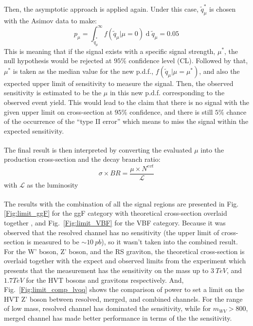 \\
\\Then, the asymptotic approach is applied again. Under this case, $\tilde{q}_{\mu}^{*}$ is chosen with the Asimov data to make:
\begin{equation}
p_{\mu}=\int_{\tilde{q}_{\mu}^{*}}^{\infty}f(\tilde{q}_{\mu}|\mu=0)\operatorname{d}\tilde{q}_{\mu}=0.05
\end{equation}
\noindent
This is meaning that if the signal exists with a specific signal strength, $\mu^*$, the null hypothesis would be rejected at $95\%$ confidence level (CL). Followed by that, $\mu^*$ is taken as the median value for the new p.d.f., $f(\tilde{q}_{\mu}|\mu=\mu^*)$, and also the expected upper limit of sensitivity to measure the signal. Then, the observed sensitivity is estimated to be the $\mu$ in this new p.d.f. corresponding to the observed event yield. This would lead to the claim that there is no signal with the given upper limit on cross-section at $95\%$ confidence, and there is still $5\%$ chance of the occurrence of the ``type II error'' which means to miss the signal within the expected sensitivity. 
\\
\\The final result is then interpreted by converting the evaluated $\mu$ into the production cross-section and the decay branch ratio:
\begin{equation}
\sigma\times BR=\frac{\mu\times N^{evt}}{\mathcal{L}}
\end{equation}  
with $\mathcal{L}$ as the luminosity
\\
\\The results with the combination of all the signal regions are presented in Fig.~ \ref{Fig:limit_ggF} for the ggF category with theoretical cross-section overlaid together , and Fig.~\ref{Fig:limit_VBF} for the VBF category. Because it was observed that the resolved channel has no sensitivity (the upper limit of cross-section is measured to be $\sim10~pb$), so it wasn't taken into the combined result. For the W' boson, Z' boson, and the RS graviton, the theoretical cross-section is overlaid together with the expect and observed limits from the experiment which presents that the measurement has the sensitivity on the mass up to $3~TeV$, and $1.7TeV$ for the HVT bosons and gravitons respectively. And, Fig.~\ref{Fig:limit_comp_lvqq} shows the comparison of power to set a limit on the HVT Z' boson between resolved, merged, and combined channels. For the range of low mass, resolved channel has dominated the sensitivity, while for $m_{WV}>800$, merged channel has made better performance in terms of the the sensitivity.


